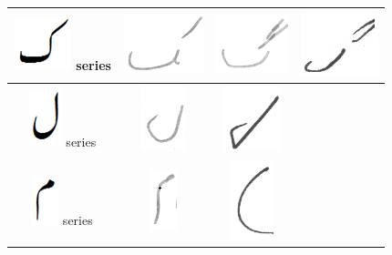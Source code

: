 \begin{table}[h]
\begin{tabular}{@{}cccc@{}}
\hline
\includegraphics[scale=0.15]{kaaf_orig} series & \includegraphics[scale=0.15]{104} & \includegraphics[scale=0.15]{105}  & 
\includegraphics[scale=0.15]{106} \\
\hline
\includegraphics[scale=0.15]{Laam_orig} series & \includegraphics[scale=0.15]{107} & \includegraphics[scale=0.15]{108}  &  \\
\hline
\includegraphics[scale=0.15]{meem_orig} series & \includegraphics[scale=0.15]{109} & \includegraphics[scale=0.15]{110}  &  \\

\end{tabular}
\end{table}
